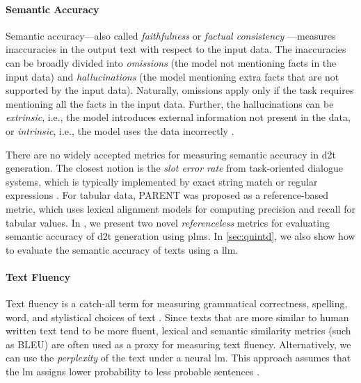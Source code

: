 {\paragraph{Semantic Accuracy} Semantic accuracy---also called \emph{faithfulness} or \emph{factual consistency} \cite{celikyilmazEvaluationTextGeneration2021}---measures inaccuracies in the output text with respect to the input data. The inaccuracies can be broadly divided into \emph{omissions} (the model not mentioning facts in the input data) and \emph{hallucinations} (the model mentioning extra facts that are not supported by the input data). Naturally, omissions apply only if the task requires mentioning all the facts in the input data. Further, the hallucinations can be \emph{extrinsic}, i.e., the model introduces external information not present in the data, or \emph{intrinsic}, i.e., the model uses the data incorrectly \cite{maynezFaithfulnessFactualityAbstractive2020}.

There are no widely accepted metrics for measuring semantic accuracy in \ac{d2t} generation. The closest notion is the \emph{slot error rate} from task-oriented dialogue systems, which is typically implemented by exact string match or regular expressions  \cite{wen2015semantically,dusekEvaluatingStateoftheartEndtoEnd2020}. For tabular data, PARENT \cite{dhingraHandlingDivergentReference2019} was proposed as a reference-based metric, which uses lexical alignment models for computing precision and recall for tabular values.  In , we present two novel \emph{referenceless} metrics for evaluating semantic accuracy of \ac{d2t} generation using \acp{plm}. In \autoref{sec:quintd}, we also show how to evaluate the semantic accuracy of texts using a \ac{llm}.

\paragraph{Text Fluency} Text fluency is a catch-all term for measuring grammatical correctness, spelling, word, and stylistical choices of text \cite{celikyilmazEvaluationTextGeneration2021}. Since texts that are more similar to human written text tend to be more fluent, lexical and semantic similarity metrics (such as BLEU) are often used as a proxy for measuring text fluency. Alternatively, we can use the \emph{perplexity} of the text under a neural \ac{lm}. This approach assumes that the \ac{lm} assigns lower probability to less probable sentences \cite{leeFactualityEnhancedLanguage2022,kaneNUBIANeUralBased2020}.


}
